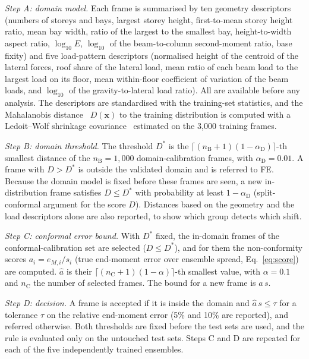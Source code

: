 \emph{Step A: domain model.} Each frame is summarised by ten geometry descriptors (numbers of storeys and bays, largest storey height, first-to-mean storey height ratio, mean bay width, ratio of the largest to the smallest bay, height-to-width aspect ratio, $\log_{10}E$, $\log_{10}$ of the beam-to-column second-moment ratio, base fixity) and five load-pattern descriptors (normalised height of the centroid of the lateral forces, roof share of the lateral load, mean ratio of each beam load to the largest load on its floor, mean within-floor coefficient of variation of the beam loads, and $\log_{10}$ of the gravity-to-lateral load ratio). All are available before any analysis. The descriptors are standardised with the training-set statistics, and the Mahalanobis distance~\cite{lee2018mahalanobis} $D(\mathbf{x})$ to the training distribution is computed with a Ledoit--Wolf shrinkage covariance~\cite{ledoit2004shrinkage} estimated on the 3{,}000 training frames.

\emph{Step B: domain threshold.} The threshold $D^\ast$ is the $\lceil (n_\mathrm{B}+1)(1-\alpha_\mathrm{D})\rceil$-th smallest distance of the $n_\mathrm{B}=1{,}000$ domain-calibration frames, with $\alpha_\mathrm{D}=0.01$. A frame with $D>D^\ast$ is outside the validated domain and is referred to FE. Because the domain model is fixed before these frames are seen, a new in-distribution frame satisfies $D\le D^\ast$ with probability at least $1-\alpha_\mathrm{D}$ (split-conformal argument for the score $D$). Distances based on the geometry and the load descriptors alone are also reported, to show which group detects which shift.

\emph{Step C: conformal error bound.} With $D^\ast$ fixed, the in-domain frames of the conformal-calibration set are selected ($D\le D^\ast$), and for them the non-conformity scores $a_i = e_{M,i}/s_i$ (true end-moment error over ensemble spread, Eq.~\eqref{eq:score}) are computed. $\hat a$ is their $\lceil (n_\mathrm{C}+1)(1-\alpha)\rceil$-th smallest value, with $\alpha=0.1$ and $n_\mathrm{C}$ the number of selected frames. The bound for a new frame is $\hat a\,s$.

\emph{Step D: decision.} A frame is accepted if it is inside the domain and $\hat a\,s\le\tau$ for a tolerance $\tau$ on the relative end-moment error (5\% and 10\% are reported), and referred otherwise. Both thresholds are fixed before the test sets are used, and the rule is evaluated only on the untouched test sets. Steps C and D are repeated for each of the five independently trained ensembles.

